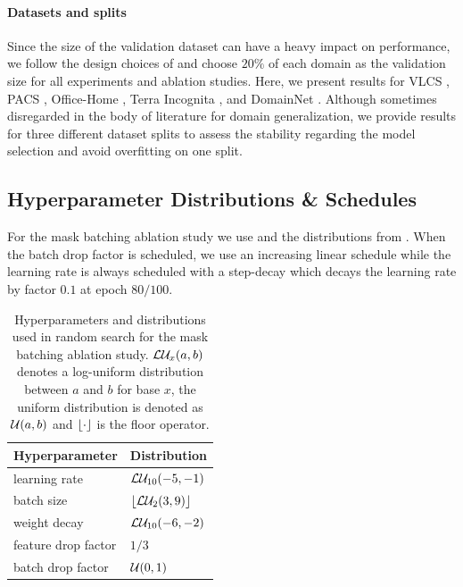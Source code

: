 \paragraph{Datasets and splits}
Since the size of the validation dataset can have a heavy impact on performance, we follow the design choices of \domainbed and choose $20\%$ of each domain as the validation size for all experiments and ablation studies. Here, we present results for VLCS \citep{FangXR13}, PACS \citep{LiYSH17}, Office-Home \citep{VenkateswaraECP17}, Terra Incognita \citep{BeeryHP18}, and DomainNet \citep{PengBXHSW19}. Although sometimes disregarded in the body of literature for domain generalization, we provide results for three different dataset splits to assess the stability regarding the model selection and avoid overfitting on one split. 

\subsection{Hyperparameter Distributions \& Schedules}
\label{sec:abl-distr}
For the mask batching ablation study we use \adam \cite{Kingma2015} and the distributions from . When the batch drop factor is scheduled, we use an increasing linear schedule while the learning rate is always scheduled with a step-decay which decays the learning rate by factor $0.1$ at epoch $80/100$.
\begin{table}[!htbp]
    \centering
    \begin{tabular}{ll}
        \toprule
        \textbf{Hyperparameter} & \textbf{Distribution} \\
        \midrule
        learning rate & $\mathcal{L}\mathcal{U}_{10}(-5, -1)$ \\
        batch size  & $\lfloor\mathcal{L}\mathcal{U}_{2}(3, 9)\rfloor$ \\
        weight decay  & $\mathcal{L}\mathcal{U}_{10}(-6, -2)$ \\
        feature drop factor  & $1/3$ \\
        batch drop factor  & $\mathcal{U}(0, 1)$ \\
         \bottomrule 
    \end{tabular}
    \caption[Hyperparameters and distributions used for the mask batching ablation study]{Hyperparameters and distributions used in random search for the mask batching ablation study. $\mathcal{L}\mathcal{U}_{x}(a, b)$ denotes a log-uniform distribution between $a$ and $b$ for base $x$, the uniform distribution is denoted as $\mathcal{U}(a, b)$ and $\lfloor\cdot\rfloor$ is the floor operator.}
    \label{tab:abl-distributions-mask-batching}
\end{table}

